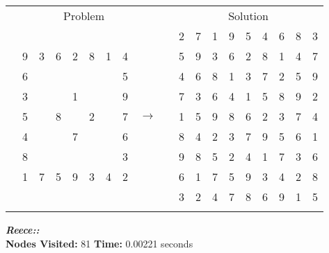 \documentclass{article}
\begin{document}
\begin{tabular}{||c|c|c||c|c|c||c|c|c|| c ||c|c|c||c|c|c||c|c|c||}
  \cmidrule{1-9} \cmidrule{11-19}
  \multicolumn{9}{|c|}{Problem} &                   & \multicolumn{9}{|c|}{Solution}   \\\cmidrule{1-9} \cmidrule{11-19} \morecmidrules \cmidrule{1-9} \cmidrule{11-19}
  &   &   &   &   &   &   &   &   &  & 2 & 7 & 1 & 9 & 5 & 4 & 6 & 8 & 3\\\cmidrule{1-9} \cmidrule{11-19}
  & 9 & 3 & 6 & 2 & 8 & 1 & 4 &   &  & 5 & 9 & 3 & 6 & 2 & 8 & 1 & 4 & 7\\\cmidrule{1-9} \cmidrule{11-19}
  & 6 &   &   &   &   &   & 5 &   &  & 4 & 6 & 8 & 1 & 3 & 7 & 2 & 5 & 9\\\cmidrule{1-9} \cmidrule{11-19} \morecmidrules \cmidrule{1-9} \cmidrule{11-19}
  & 3 &   &   & 1 &   &   & 9 &   &  & 7 & 3 & 6 & 4 & 1 & 5 & 8 & 9 & 2\\\cmidrule{1-9} \cmidrule{11-19}
  & 5 &   & 8 &   & 2 &   & 7 & $\rightarrow$  &  & 1 & 5 & 9 & 8 & 6 & 2 & 3 & 7 & 4\\\cmidrule{1-9} \cmidrule{11-19}
  & 4 &   &   & 7 &   &   & 6 &   &  & 8 & 4 & 2 & 3 & 7 & 9 & 5 & 6 & 1\\\cmidrule{1-9} \cmidrule{11-19} \morecmidrules \cmidrule{1-9} \cmidrule{11-19}
  & 8 &   &   &   &   &   & 3 &   &  & 9 & 8 & 5 & 2 & 4 & 1 & 7 & 3 & 6\\\cmidrule{1-9} \cmidrule{11-19}
  & 1 & 7 & 5 & 9 & 3 & 4 & 2 &   &  & 6 & 1 & 7 & 5 & 9 & 3 & 4 & 2 & 8\\\cmidrule{1-9} \cmidrule{11-19}
  &   &   &   &   &   &   &   &   &  & 3 & 2 & 4 & 7 & 8 & 6 & 9 & 1 & 5\\\cmidrule{1-9} \cmidrule{11-19} \morecmidrules \cmidrule{1-9} \cmidrule{11-19}

\end{tabular}
\newpage
\small\emph{\textbf{Reece::}}\\ \textbf{Nodes Visited:} 81 \textbf{Time:} 0.00221 seconds\\
\end{document}
